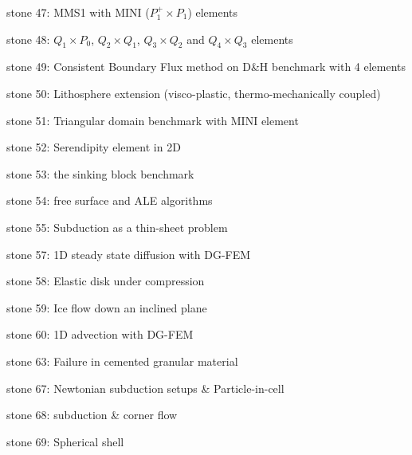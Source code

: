 {\noindent stone 47: MMS1 with MINI ($P_1^+\times P_1$) elements


\noindent stone 48: $Q_1\times P_0$, $Q_2\times Q_1$, $Q_3\times Q_2$ and $Q_4\times Q_3$ elements


\noindent stone 49: Consistent Boundary Flux method on D\&H benchmark with 4 elements 


\noindent stone 50: Lithosphere extension (visco-plastic, thermo-mechanically coupled)


\noindent stone 51: Triangular domain benchmark with MINI element


\noindent stone 52: Serendipity element in 2D 


\noindent stone 53: the sinking block benchmark  


\noindent stone 54: free surface and ALE algorithms


\noindent stone 55: Subduction as a thin-sheet problem


\noindent stone 57: 1D steady state diffusion with DG-FEM


\noindent stone 58: Elastic disk under compression


\noindent stone 59: Ice flow down an inclined plane 


\noindent stone 60: 1D advection with DG-FEM 


\noindent stone 63: Failure in cemented granular material


\noindent stone 67: Newtonian subduction setups \& Particle-in-cell


\noindent stone 68: subduction \& corner flow


\noindent stone 69: Spherical shell 


}









